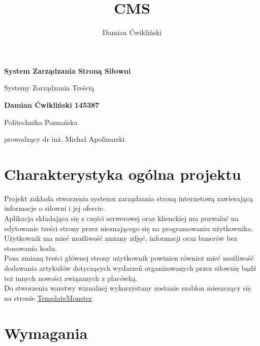 \documentclass[12pt]{article}
\title{CMS}
\author{Damian Ćwikliński}
\begin{document}
\begin{titlepage}
    \begin{center}
        \vspace*{4cm}
            
        \Huge
        \textbf{System Zarządzania Stroną Siłowni}
            
        \vspace{0.5cm}
        \LARGE
        Systemy Zarządzania Treścią
            
        \vspace{1.5cm}
            
        \textbf{Damian Ćwikliński 145387}
            
        \vfill
            
        Politechnika Poznańska
            
        \vspace{0.8cm}
           
            
        prowadzący dr inż. Michał Apolinarski
            
    \end{center}
\end{titlepage}

\tableofcontents

\newpage
\section{Charakterystyka ogólna projektu}
Projekt zakłada stworzenia systemu zarządzania stroną internetową zawierającą informacje o siłowni i jej ofercie. 
\\

Aplikacja składająca się z części serwerowej oraz klienckiej ma pozwalać na edytowanie treści strony przez nieznającego się na programowaniu użytkownika. Użytkownik ma mieć możliwość zmiany zdjęć, informacji oraz banerów bez stosowania kodu.
\\

Poza zmianą treści głównej strony użytkownik powinien również mieć możliwość dodawania artykułów dotyczących wydarzeń organizowanych przez siłownię bądź też innych nowości związanych z placówką.
\\

Do stworzenia warstwy wizualnej wykorzystany zostanie szablon mieszczący się na stronie \href{https://demo.templatemonster.com/demo/51682.html}{TemplateMonster}.

\newpage
\section{Wymagania}
\end{document}
